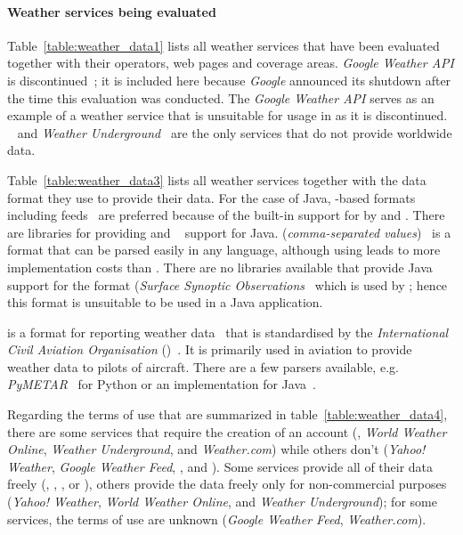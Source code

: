 \paragraph{Weather services being evaluated}

Table~\ref{table:weather_data1} lists all weather services that have been evaluated together with their operators, web pages and coverage areas. \emph{Google Weather API} is discontinued~\cite{google_weather}; it is included here because \emph{Google} announced its shutdown after the time this evaluation was conducted. The \emph{Google Weather API} serves as an example of a weather service that is unsuitable for usage in \smarthomeweather as it is discontinued. ~\cite{dwd} and \emph{Weather Underground}~\cite{weather_underground} are the only services that do not provide worldwide data.

Table~\ref{table:weather_data3} lists all weather services together with the data format they use to provide their data. For the case of Java, -based formats including  feeds~\cite{RSS} are preferred because of the built-in support for  by  and . There are libraries for providing  and ~\cite{jsonp} support for Java.  (\emph{comma-separated values})~\cite{rfc4180} is a format that can be parsed easily in any language, although using  leads to more implementation costs than . There are no libraries available that provide Java support for the  format (\emph{Surface Synoptic Observations}~\cite{SYNOP} which is used by ; hence this format is unsuitable to be used in a Java application.

 is a format for reporting weather data~\cite{metar} that is standardised by the \emph{International Civil Aviation Organisation} ()~\cite{ICAO}. It is primarily used in aviation to provide weather data to pilots of aircraft. There are a few parsers available, e.g. \emph{PyMETAR}~\cite{pymetar} for Python or an implementation for Java~\cite{metar-java}.

Regarding the terms of use that are summarized in table~\ref{table:weather_data4}, there are some services that require the creation of an account (, \emph{World Weather Online}, \emph{Weather Underground}, and \emph{Weather.com}) while others don't (\emph{Yahoo! Weather}, \emph{Google Weather Feed}, \yrno, and ). Some services provide all of their data freely (, \yrno, , or ), others provide the data freely only for non-commercial purposes (\emph{Yahoo! Weather}, \emph{World Weather Online}, and \emph{Weather Underground}); for some services, the terms of use are unknown (\emph{Google Weather Feed}, \emph{Weather.com}).

